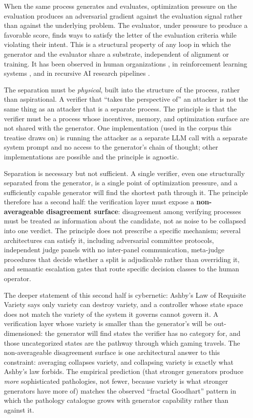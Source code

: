 \documentclass[11pt]{article}
\begin{document}
When the same process generates and evaluates, optimization pressure on the evaluation produces an adversarial gradient against the evaluation signal rather than against the underlying problem. The evaluator, under pressure to produce a favorable score, finds ways to satisfy the letter of the evaluation criteria while violating their intent. This is a structural property of any loop in which the generator and the evaluator share a substrate, independent of alignment or training. It has been observed in human organizations \citep{chandler1962}, in reinforcement learning systems \citep{krakovna2020}, and in recursive AI research pipelines \citep{alami2026a}.

The separation must be \emph{physical}, built into the structure of the process, rather than aspirational. A verifier that ``takes the perspective of'' an attacker is not the same thing as an attacker that is a separate process. The principle is that the verifier must be a process whose incentives, memory, and optimization surface are not shared with the generator. One implementation (used in the corpus this treatise draws on) is running the attacker as a separate LLM call with a separate system prompt and no access to the generator's chain of thought; other implementations are possible and the principle is agnostic.

Separation is necessary but not sufficient. A single verifier, even one structurally separated from the generator, is a single point of optimization pressure, and a sufficiently capable generator will find the shortest path through it. The principle therefore has a second half: the verification layer must expose a \textbf{non-averageable disagreement surface}: disagreement among verifying processes must be treated as information about the candidate, not as noise to be collapsed into one verdict. The principle does not prescribe a specific mechanism; several architectures can satisfy it, including adversarial committee protocols, independent judge panels with no inter-panel communication, meta-judge procedures that decide whether a split is adjudicable rather than overriding it, and semantic escalation gates that route specific decision classes to the human operator.

The deeper statement of this second half is cybernetic: Ashby's Law of Requisite Variety \citep{ashby1956} says only variety can destroy variety, and a controller whose state space does not match the variety of the system it governs cannot govern it. A verification layer whose variety is smaller than the generator's will be out-dimensioned: the generator will find states the verifier has no category for, and those uncategorized states are the pathway through which gaming travels. The non-averageable disagreement surface is one architectural answer to this constraint: averaging collapses variety, and collapsing variety is exactly what Ashby's law forbids. The empirical prediction (that stronger generators produce \emph{more} sophisticated pathologies, not fewer, because variety is what stronger generators have more of) matches the observed ``fractal Goodhart'' pattern in which the pathology catalogue grows with generator capability rather than against it.
\end{document}
